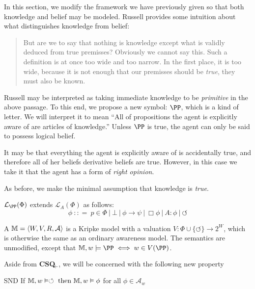 In this section, we modify the framework we have previously given so that both
knowledge and belief may be modeled.  Russell provides some intuition
about what distinguishes knowledge from belief\cite[pg. 63]{russell_problems_1936}:
\begin{quote}
But are we to say that nothing is knowledge except what is validly deduced
from true premisses? Obviously we cannot say this. Such a definition is at
once too wide and too narrow. In the first place, it is too wide, because it is
not enough that our premisses should be \emph{true}, they must also be
known.
\end{quote}
Russell may be interpreted as taking immediate knowledge to be
\emph{primitive} in the above passage.  To this end, we propose a new
symbol: $\PP$, which is a kind of letter.  We will interpret it to mean ``All of propositions
the agent is explicitly aware of are articles of knowledge.'' Unless $\PP$ is
true, the agent can only be said to possess logical belief.  

It may be that everything the agent is explicitly aware of is accidentally true,
and therefore all of her beliefs derivative beliefs are true.
However, in this case we take it that the agent has a form of
\emph{right opinion}. 

As before, we make the minimal assumption that knowledge is \emph{true}.

\begin{definition}
   $\mathcal{L}_\PP
  (\Phi)$ extends $\mathcal{L}_A(\Phi)$ as follows:
  \[ \phi \  : : = \  p \in \Phi \  | \  \bot
     \  | \  \phi \rightarrow \psi \  |
     \  \Box \phi \  | \  A : \phi \ |\ \circlearrowleft 
  \]
\end{definition}

\begin{definition}
  \label{awarenessmodels}A {} $\mathbbm{M}= \langle
  W, V, R, \mathcal{A} \rangle$ is a Kripke model with a valuation $V : \Phi
  \cup \{\circlearrowleft\} \rightarrow 2^W$, which is otherwise the
  same as an ordinary awareness model.  The semantics are unmodified,
  except that $\mathbb{M},w \models \PP \iff w \in V(\PP)$.
\end{definition}

Aside from \textbf{CSQ$_\vdash$}, we will be concerned with the
following new property

\begin{definition}\label{snd1}
  \begin{descriptiondash}
    \item[SND] If $\mathbbm{M}, w \vDash \circlearrowleft \text{ then }
    \mathbbm{M}, w \vDash \phi$ for all $\phi \in \mathcal{A}_w$
  \end{descriptiondash}
\end{definition}

